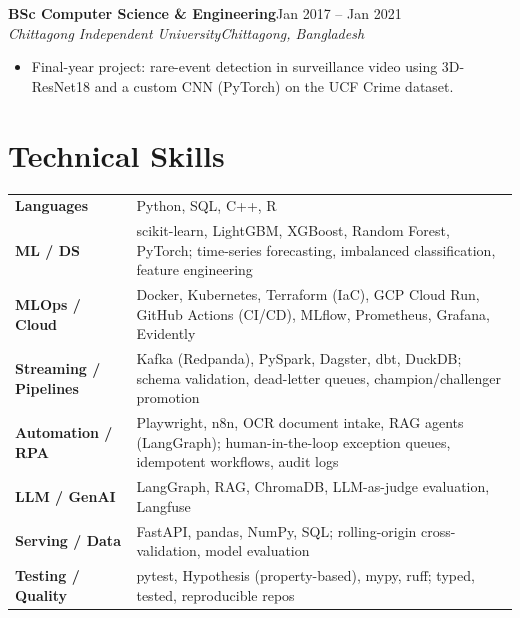 \documentclass[10pt,a4paper]{article}
\newcommand{\entry}[4]{%
  \textbf{#1}\hfill{\color{muted}\small #2}\\[1pt]
  {\color{accent}\itshape #3}\hfill{\color{muted}\itshape\small #4}\par\vspace{2pt}}
\begin{document}
\entry{BSc Computer Science \& Engineering}{Jan 2017 -- Jan 2021}{Chittagong Independent University}{Chittagong, Bangladesh}
\begin{itemize}
  \item Final-year project: rare-event detection in surveillance video using 3D-ResNet18 and a custom CNN (PyTorch) on the UCF Crime dataset.
\end{itemize}

\section{Technical Skills}
\begin{tabularx}{\linewidth}{@{}l X@{}}
  \textbf{\color{accent}Languages} & Python, SQL, C++, R \\[1pt]
  \textbf{\color{accent}ML / DS} & scikit-learn, LightGBM, XGBoost, Random Forest, PyTorch; time-series forecasting, imbalanced classification, feature engineering \\[1pt]
  \textbf{\color{accent}MLOps / Cloud} & Docker, Kubernetes, Terraform (IaC), GCP Cloud Run, GitHub Actions (CI/CD), MLflow, Prometheus, Grafana, Evidently \\[1pt]
  \textbf{\color{accent}Streaming / Pipelines} & Kafka (Redpanda), PySpark, Dagster, dbt, DuckDB; schema validation, dead-letter queues, champion/challenger promotion \\[1pt]
  \textbf{\color{accent}Automation / RPA} & Playwright, n8n, OCR document intake, RAG agents (LangGraph); human-in-the-loop exception queues, idempotent workflows, audit logs \\[1pt]
  \textbf{\color{accent}LLM / GenAI} & LangGraph, RAG, ChromaDB, LLM-as-judge evaluation, Langfuse \\[1pt]
  \textbf{\color{accent}Serving / Data} & FastAPI, pandas, NumPy, SQL; rolling-origin cross-validation, model evaluation \\[1pt]
  \textbf{\color{accent}Testing / Quality} & pytest, Hypothesis (property-based), mypy, ruff; typed, tested, reproducible repos \\
\end{tabularx}

\end{document}
